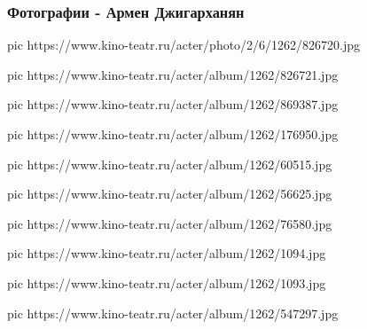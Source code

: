  
 
 

\subsubsection{Фотографии - Армен Джигарханян}

\ifcmt
pic https://www.kino-teatr.ru/acter/photo/2/6/1262/826720.jpg

pic https://www.kino-teatr.ru/acter/album/1262/826721.jpg

pic https://www.kino-teatr.ru/acter/album/1262/869387.jpg

pic https://www.kino-teatr.ru/acter/album/1262/176950.jpg

pic https://www.kino-teatr.ru/acter/album/1262/60515.jpg

pic https://www.kino-teatr.ru/acter/album/1262/56625.jpg

pic https://www.kino-teatr.ru/acter/album/1262/76580.jpg

pic https://www.kino-teatr.ru/acter/album/1262/1094.jpg

pic https://www.kino-teatr.ru/acter/album/1262/1093.jpg

pic https://www.kino-teatr.ru/acter/album/1262/547297.jpg
\fi
